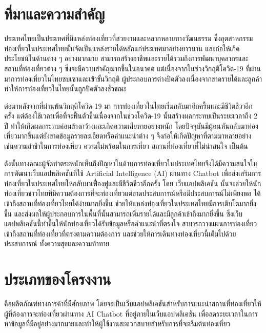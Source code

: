 \documentclass[12pt,oneside,openright,a4paper]{cpe-thai-project}
\begin{document}
\section{ที่มาและความสำคัญ}
\setlength{\parindent}{1cm}
ประเทศไทยเป็นประเทศที่มีแหล่งท่องเที่ยวที่สวยงามและหลากหลายทางวัฒนธรรม ซึ่งอุตสาหกรรมท่องเที่ยวในประเทศไทยนั้นจัดเป็นแหล่งรายได้หลักแก่ประเทศมาอย่างยาวนาน และก่อให้เกิดประโยชน์ในด้านต่าง ๆ อย่างมากมาย สามารถสร้างอาชีพและรายได้รวมถึงการพัฒนาบุคลากรและสถานที่ท่องเที่ยวต่าง ๆ ซึ่งจะมีความสำคัญมากขึ้นในอนาคต แต่เนื่องจากในช่วงวิกฤติโควิด-19 ที่ผ่านมาการท่องเที่ยวในไทยซบเซาและเข้าขั้นวิกฤติ ผู้ประกอบการต่างปิดตัวลงเนื่องจากขาดรายได้และลูกค้า ทำให้การท่องเที่ยวในไทยนั้นถูกปิดตัวลงชั่วขณะ

ต่อมาหลังจากที่ผ่านพ้นวิกฤติโควิด-19 มา การท่องเที่ยวในไทยเริ่มกลับมาคึกครื้นและมีชีวิตชีวาอีกครั้ง แต่ต้องใช้เวลาเพื่อที่จะฟื้นตัวขึ้นเนื่องจากในช่วงโควิด-19 นั้นสร้างผลกระทบเป็นระยะเวลาถึง 2 ปี ทำให้เกิดผลกระทบค่อนข้างกว้างและเกิดความเสียหายอย่างหนัก โดยปัจจุบันมีผู้คนหันกลับมาท่องเที่ยวมากขึ้นแต่ยังขาดข้อมูลรายละเอียดหรือคำแนะนำต่าง ๆ จึงก่อให้เกิดปัญหาที่ตามมาหลายอย่าง เช่นความล่าช้าในการท่องเที่ยว ความไม่พร้อมในการเที่ยว สถานที่ท่องเที่ยวที่ไม่น่าสนใจ เป็นต้น

ดังนั้นทางคณะผู้จัดทำตระหนักเห็นถึงปัญหาในด้านการท่องเที่ยวในประเทศไทยจึงได้มีความสนใจในการพัฒนาเว็บแอปพลิเคชันที่ใช้ Artificial Intelligence (AI) ผ่านทาง Chatbot เพื่อส่งเสริมการท่องเที่ยวในประเทศไทยให้กลับมาเฟื่องฟูและมีชีวิตชีวาอีกครั้ง โดย เว็บแอปพลิเคชัน นั้นจะช่วยให้นักท่องเที่ยวชาวไทยที่มีความต้องการที่จะท่องเที่ยวแต่ขาดประสบการณ์หรือมีประสบการณ์ไม่เพียงพอ ได้เข้าถึงสถานที่ท่องเที่ยวไทยได้ง่ายมากยิ่งขึ้น ช่วยให้แหล่งท่องเที่ยวในประเทศไทยมีการเติบโตมากยิ่งขึ้น และส่งผลให้ผู้ประกอบการในพื้นที่นั้นสามารถเพิ่มรายได้และมีลูกค้าเข้าถึงมากยิ่งขึ้น ซึ่งเว็บแอปพลิเคชันนี้ทำขึ้นให้นักท่องเที่ยวได้รับข้อมูลหรือคำแนะนำที่ตรงใจ สามารถวางแผนการท่องเที่ยวเข้าถึงสถานที่ท่องเที่ยวที่ตรงตามความต้องการ และช่วยให้การเดินทางท่องเที่ยวนี้เต็มไปด้วยประสบการณ์ ทั้งความสุขและความท้าทาย

\section{ประเภทของโครงงาน}
คือผลิตภัณฑ์ทางการค้าที่มีศักยภาพ โดยจะเป็นเว็บแอปพลิเคชันสำหรับการแนะนำสถานที่ท่องเที่ยวให้ผู้ที่ต้องการจะท่องเที่ยวผ่านทาง AI Chatbot ที่อยู่ภายในเว็บแอปพลิเคชัน เพื่อลดระยะเวลาในการหาข้อมูลที่มีอยู่อย่างมากมายและทำให้ผู้ใช้งานสะดวกสบายสำหรับการที่จะเริ่มต้นท่องเที่ยว
\end{document}
